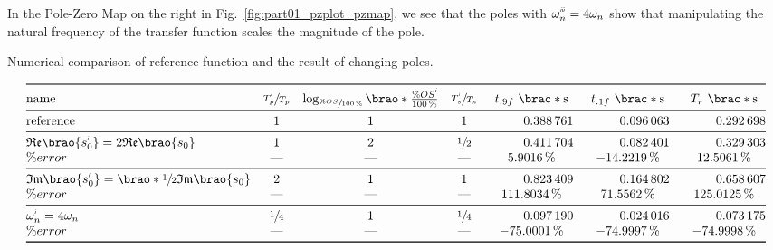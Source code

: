 \documentclass[12pt]{article}
\DeclarePairedDelimiter\brao()%
\DeclarePairedDelimiter\brac[]%
\newcommand{\setprime}[2][1]{%
    {#2}^{%
        \raisebox{1pt}{%
            \scalebox{0.5}{%
                \itshape\sffamily\uppercase%
                \expandafter{%
                    \romannumeral#1%
                }%
            }%
        }
    }%
}%
\begin{document}
In the Pole-Zero Map on the right in Fig.~\ref{fig:part01_pzplot_pzmap}, we see that the poles with $\setprime[3]\omega_n = 4\omega_n$ show that manipulating the natural frequency of the transfer function scales the magnitude of the pole.

\begin{table}[]
    \centering
    \caption{Numerical comparison of reference function and the result of changing poles.}
    \[
        \begin{array}{@{}l*3c*3S@{}}
        \toprule
            \text{name}
                & \sfrac{\setprime{T}_p}{T_p}
                & \log_{\sfrac{\%OS}{\SI{100}\percent}}\brao*{\frac{\%\setprime{OS}}{\SI{100}\percent}}
                & \sfrac{\setprime{T}_s}{T_s}
                & t_{.9f}\ \brac*{\si\second}
                & t_{.1f}\ \brac*{\si\second}
                & T_r\ \brac*{\si\second}
        \\*
        \midrule
            \text{reference}
            & 1
            & 1
            & 1
            & 0.388761
            & 0.096063
            & 0.292698
        \\*
        \midrule
            \mathfrak{Re}\brao{\setprime{s}_0} = 2\mathfrak{Re}\brao{s_0}
            & 1
            & 2
            & \sfrac12
            & 0.411704
            & 0.082401
            & 0.329303
        \\*
            \%error
            & \text{---}
            & \text{---}
            & \text{---}
            & \SI{+5.9016}\percent
            & \SI{-14.2219}\percent
            & \SI{+12.5061}\percent
        \\*
        \midrule
            \mathfrak{Im}\brao{\setprime{s}_0} = \brao*{\sfrac12}\mathfrak{Im}\brao{s_0}
            & 2
            & 1
            & 1
            & 0.823409
            & 0.164802
            & 0.658607
        \\*
            \%error
            & \text{---}
            & \text{---}
            & \text{---}
            & \SI{+111.8034}\percent
            & \SI{+71.5562}\percent
            & \SI{+125.0125}\percent
        \\*
        \midrule
            \setprime\omega_n = 4\omega_n
            & \sfrac14
            & 1
            & \sfrac14
            & 0.097190
            & 0.024016
            & 0.073175
        \\*
            \%error
            & \text{---}
            & \text{---}
            & \text{---}
            & \SI{-75.0001}\percent
            & \SI{-74.9997}\percent
            & \SI{-74.9998}\percent
        \\*
        \bottomrule
        \end{array}
    \]
    \label{tab:changing poles}
\end{table}
\end{document}
